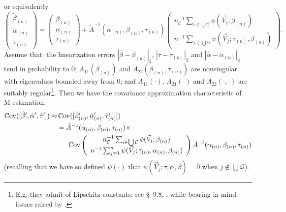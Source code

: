 \documentclass{article}
\begin{document}
or equivalently
\begin{equation*}
\left(\begin{array}{c}\tilde{\beta}_{(n)}\\ \tilde{\alpha}_{(n)}\\ \tilde{\tau}_{(n)} \end{array}\right)
    = \left(\begin{array}{c}\beta_{(n)} \\\alpha_{(n)}\\
                    \tau_{(n)} \end{array}\right)
    + \tilde{A}^{-1}(\alpha_{(n)}, \beta_{(n)}, \tau_{(n)})\left(
    \begin{array}{c}
      n_{\mathcal{C}}^{-1}\sum_{i\in \bigcup
      \mathcal{C}}\phi(\vec{V}_{i}; \beta_{(n)})\\
      n^{-1}\sum_{j\in \bigcup
                 \mathcal{Q}}\psi(\vec{V}_{j};
                 \tau_{(n)},\beta_{(n)} )
    \end{array}
\right).
\end{equation*}
Assume that: the linearization errors $|\hat\beta -\tilde{\beta}_{(n)}|_{2}$, 
$|\hat\tau -\tilde{\tau}_{(n)}|_{2}$ and $|\hat\alpha - \tilde{\alpha}_{(n)}|_{2}$ tend in probability to 0;
$A_{11}(\beta_{(n)})$ and $A_{22}(\beta_{(n)}, \tau_{(n)})$ are nonsingular
with eigenvalues bounded away from 0; and $A_{11}(\cdot)$, $A_{21}(\cdot)$ and $A_{22}(\cdot, \cdot)$ are suitably
regular\footnote{E.g, they admit of Lipschitz constants: see \S~9.8,
  , while bearing in mind issues raised
  by .}. 
Then we have the covariance approximation characteristic of M-estimation,
\begin{align*} \operatorname{Cov}([\hat\beta',\hat\alpha', \hat\tau']) \approx&
  \operatorname{Cov}([\tilde{\beta}_{(n)}',\hat{\alpha}_{(n)}',\tilde{\tau}_{(n)}'])\\
  &=
    \tilde{A}^{-1}(\alpha_{(n)}, \beta_{(n)}, \tau_{(n)}) \times \\
  &\hspace{1.5em} \operatorname{Cov}\left(
     \begin{array}{c}
       n_{\mathcal{C}}^{-1}\sum_{i\in \bigcup \mathcal{C}}\phi(\vec{V}_{i}; \beta_{(n)} )\\
       n^{-1}\sum_{j=1}^{n}\psi(\vec{V}_{j}; \tau_{(n)}, \alpha_{(n)}, \beta_{(n)} )
     \end{array}
    \right)
  \tilde{A}^{-t}(\alpha_{(n)}, \beta_{(n)}, \tau_{(n)})
\end{align*}
(recalling that we have so defined $\psi(\cdot)$ that $\psi(\vec{V}_{j}; \tau, \alpha, \beta) = 0$ when
$j\not\in \bigcup \mathcal{Q}$).
\end{document}
